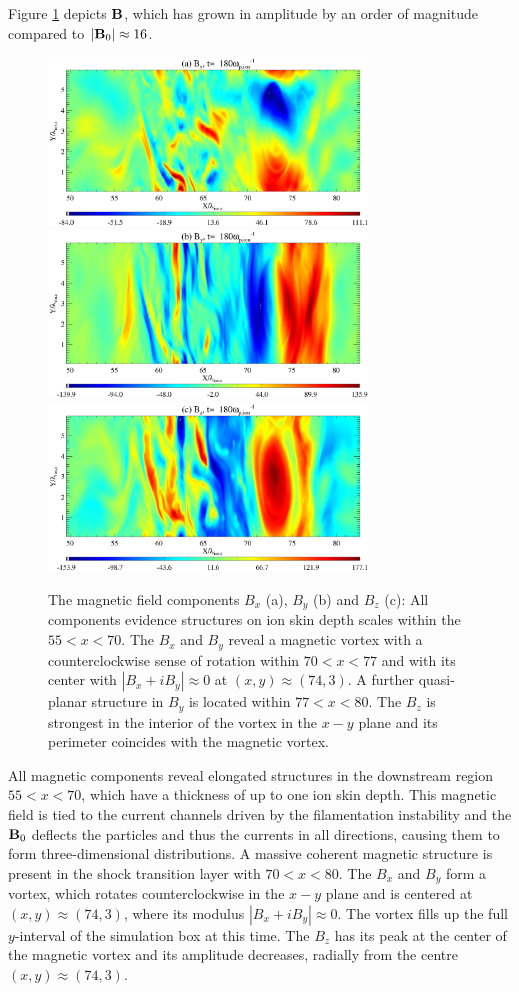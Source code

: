 \documentclass[twocolumn,showpacs,preprintnumbers,amsmath,amssymb]{revtex4}
\begin{document}
Figure \ref{fig3} depicts ${\bf B}$, which has grown in amplitude by an order of magnitude compared
to $|{\bf B}_0| \approx 16$.
\begin{figure}
\includegraphics[width=8.5cm]{Fig3a.eps}
\includegraphics[width=8.5cm]{Fig3b.eps}
\includegraphics[width=8.5cm]{Fig3c.eps}
\caption{The magnetic field components $B_x$ (a), $B_y$ (b) and $B_z$ (c): All components evidence 
structures on ion skin depth scales within the $55<x<70$. The $B_x$ and $B_y$ reveal a magnetic vortex
with a counterclockwise sense of rotation within $70<x<77$ and with its center with $|B_x + iB_y| 
\approx 0$ at $(x,y) \approx (74,3)$. A further quasi-planar structure in $B_y$ is located within 
$77<x<80$. The $B_z$ is strongest in the interior of the vortex in the $x-y$ plane and its perimeter 
coincides with the magnetic vortex.\label{fig3}}
\end{figure}
All magnetic components reveal elongated structures in the downstream region $55<x<70$, which have
a thickness of up to one ion skin depth. This magnetic field is tied to the current channels driven 
by the filamentation instability and the ${\bf B}_0$ deflects the particles and thus the currents 
in all directions, causing them to form three-dimensional distributions. A massive coherent magnetic 
structure is present in the shock transition layer with $70<x<80$. The $B_x$ and $B_y$ form a vortex, 
which rotates counterclockwise in the $x-y$ plane and is centered at $(x,y) \approx (74,3)$, where 
its modulus $|B_x + iB_y| \approx 0$. The vortex fills up the full $y$-interval of the simulation box 
at this time. The $B_z$ has its peak at the center of the magnetic vortex and its amplitude decreases, 
radially from the centre $(x,y) \approx (74,3)$.
\end{document}
